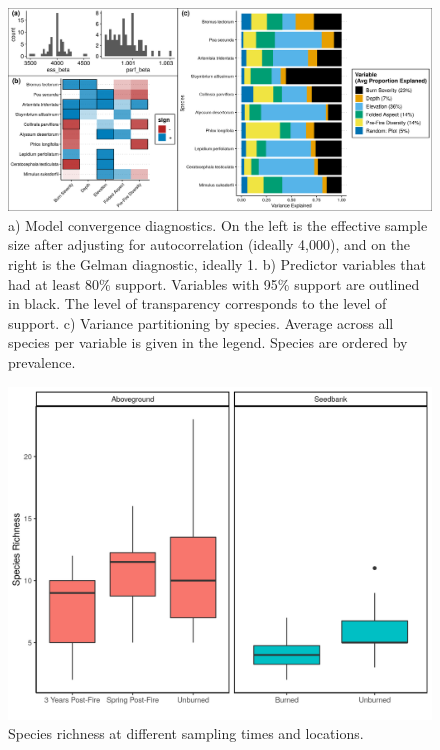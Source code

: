 \documentclass[
  11pt,
]{article}
\begin{document}
\begin{figure}
\centering
\includegraphics{images/jsdm_stuff.png}
\caption{a) Model convergence diagnostics. On the left is the effective
sample size after adjusting for autocorrelation (ideally 4,000), and on
the right is the Gelman diagnostic, ideally 1. b) Predictor variables
that had at least 80\% support. Variables with 95\% support are outlined
in black. The level of transparency corresponds to the level of support.
c) Variance partitioning by species. Average across all species per
variable is given in the legend. Species are ordered by prevalence.}
\end{figure}

\begin{figure}
\centering
\includegraphics{images/richness_fig.png}
\caption{Species richness at different sampling times and locations.}
\end{figure}
\end{document}
